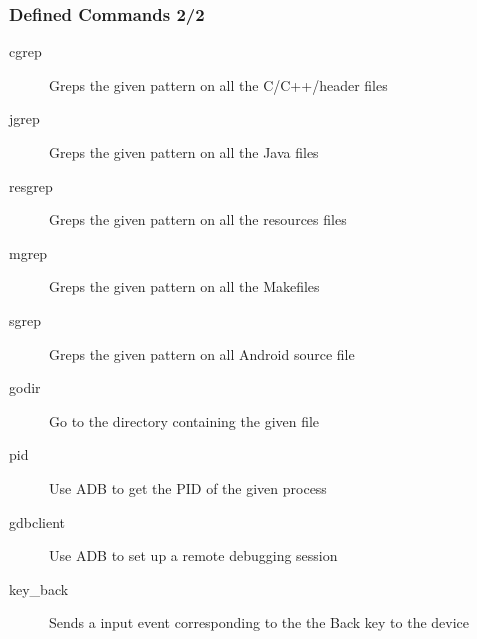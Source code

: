 \begin{frame}    
  \frametitle{Defined Commands 2/2}
  \begin{description}
  \item[cgrep] Greps the given pattern on all the C/C++/header files
  \item[jgrep] Greps the given pattern on all the Java files
  \item[resgrep] Greps the given pattern on all the resources files
  \item[mgrep] Greps the given pattern on all the Makefiles
  \item[sgrep] Greps the given pattern on all Android source file
  \item[godir] Go to the directory containing the given file
  \item[pid] Use ADB to get the PID of the given process
  \item[gdbclient] Use ADB to set up a remote debugging session
  \item[key_back] Sends a input event corresponding to the the Back
    key to the device
  \end{description}
\end{frame}
